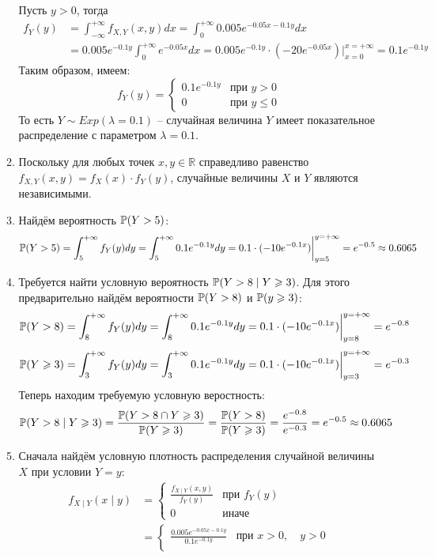 \begin{enumerate}
\begin{enumerate}
Пусть $y > 0 $, тогда
\begin{align*}
f_Y (y) &= \int_{-\infty}^{+\infty} f_{X, Y} (x, y) dx  = \int_{0}^{+\infty} 0.005 e^{-0.05x-0.1y} dx \\
&= 0.005e^{-0.1y} \int_{0}^{+\infty} e^{-0.05x} dx = 0.005e^{-0.1y} \cdot \left(-20e^{-0.05x} \right) \bigg\vert_{x=0}^{x=+\infty} = 0.1 e^{-0.1y}
\end{align*}
Таким образом, имеем:
\[
f_Y (y) = \begin{cases}
0.1 e^{-0.1y} & \text{при } y>0 \\
0 & \text{при } y \leq 0
\end{cases}
\]
То есть $Y \sim Exp(\lambda=0.1)$ – случайная величина $Y$ имеет показательное распределение с параметром $\lambda = 0.1$.
\item Поскольку для любых точек $x, y \in \mathbb{R}$ справедливо равенство $f_{X, Y} (x, y) = f_X (x) \cdot f_Y (y)$, случайные величины $X$ и $Y$ являются независимыми.
\item Найдём вероятность $\P(Y>5)$:
\[
\P(Y>5) = \int_{5}^{+\infty} f_Y (y) dy = \int_{5}^{+\infty}  0.1 e^{-0.1y} dy = 0.1 \cdot (-10 e^{-0.1x}) \bigg\vert_{y=5}^{y=+\infty} = e^{-0.5} \approx0.6065
\]
\item Требуется найти условную вероятность $\P(Y>8 \mid Y \geq 3)$. Для этого предварительно найдём вероятности $\P(Y>8)$ и $\P(y \geq 3)$:
\[
\P(Y>8) = \int_{8}^{+\infty} f_Y (y) dy  = \int_{8}^{+\infty}  0.1 e^{-0.1y} dy = 0.1 \cdot (-10 e^{-0.1x}) \bigg\vert_{y=8}^{y=+\infty} = e^{-0.8}
\]
\[
\P(Y \geq 3) =  \int_{3}^{+\infty} f_Y (y) dy   =  \int_{3}^{+\infty}  0.1 e^{-0.1y} dy = 0.1 \cdot (-10 e^{-0.1x}) \bigg\vert_{y=3}^{y=+\infty} = e^{-0.3}
\]
Теперь находим требуемую условную веростность:
\[
\P(Y>8 \mid Y \geq 3) = \frac{\P(Y > 8 \cap
Y \geq 3)}{\P(Y \geq 3)} = \frac{\P(Y>8)}{\P(Y \geq 3) } = \frac{e^{-0.8}}{e^{-0.3}} = e^{-0.5} \approx0.6065
\]
\item Сначала найдём условную плотность распределения случайной величины $X$ при условии $Y=y$:
\begin{align*}
f_{X \mid Y} (x \mid y) &=
\begin{cases}
\frac{f_{X \mid Y} (x, y)}{f_Y (y)} & \text{при } f_Y (y) \\
0 & \text{иначе}
\end{cases} \\
&=
\begin{cases}
\frac{0.005e^{-0.05x-0.1y}}{0.1e^{-0.1y}} & \text{при } x>0, \quad y>0 \\

\end{cases}
\end{align*}
\end{enumerate}
\end{enumerate}

